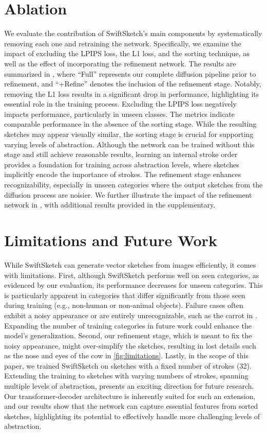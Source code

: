 

\section{Ablation}
We evaluate the contribution of SwiftSketch's main components by systematically removing each one and retraining the network. Specifically, we examine the impact of excluding the LPIPS loss, the L1 loss, and the sorting technique, as well as the effect of incorporating the refinement network.
The results are summarized in , where ``Full'' represents our complete diffusion pipeline prior to refinement, and ``+Refine'' denotes the inclusion of the refinement stage.
Notably, removing the L1 loss results in a significant drop in performance, highlighting its essential role in the training process. Excluding the LPIPS loss negatively impacts performance, particularly in unseen classes. 
The metrics indicate comparable performance in the absence of the sorting stage. While the resulting sketches may appear visually similar, the sorting stage is crucial for supporting varying levels of abstraction. Although the network can be trained without this stage and still achieve reasonable results, learning an internal stroke order provides a foundation for training across abstraction levels, where sketches implicitly encode the importance of strokes.
The refinement stage enhances recognizability, especially in unseen categories where the output sketches from the diffusion process are noisier. We further illustrate the impact of the refinement network in , with additional results provided in the supplementary. 



\section{Limitations and Future Work}
While SwiftSketch can generate vector sketches from images efficiently, it comes with limitations.
First, although SwiftSketch performs well on seen categories, as evidenced by our evaluation, its performance decreases for unseen categories. This is particularly apparent in categories that differ significantly from those seen during training (e.g., non-human or non-animal objects). Failure cases often exhibit a noisy appearance or are entirely unrecognizable, such as the carrot in . Expanding the number of training categories in future work could enhance the model's generalization.
Second, our refinement stage, which is meant to fix the noisy appearance, might over-simplify the sketches, resulting in lost details such as the nose and eyes of the cow in \cref{fig:limitations}.
Lastly, in the scope of this paper, we trained SwiftSketch on sketches with a fixed number of strokes (32). Extending the training to sketches with varying numbers of strokes, spanning multiple levels of abstraction, presents an exciting direction for future research. Our transformer-decoder architecture is inherently suited for such an extension, and our results show that the network can capture essential features from sorted sketches, highlighting its potential to effectively handle more challenging levels of abstraction.

